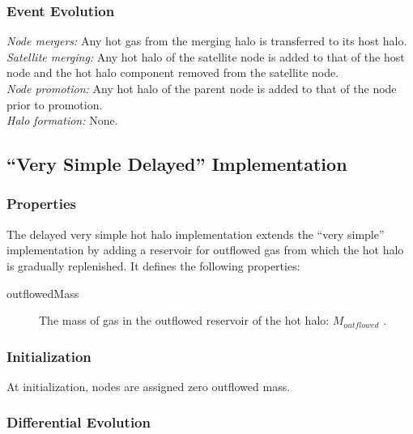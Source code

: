 \subsubsection{Event Evolution}

\noindent\emph{Node mergers:} Any hot gas from the merging halo is transferred to its host halo.\\

\noindent\emph{Satellite merging:} Any hot halo of the satellite \gls{node} is added to that of the host \gls{node} and the hot halo \gls{component} removed from the satellite node.\\

\noindent\emph{Node promotion:} Any hot halo of the parent \gls{node} is added to that of the \gls{node} prior to promotion.\\

\noindent\emph{Halo formation:} None.\\

\subsection{``Very Simple Delayed'' Implementation}

\subsubsection{Properties}

The delayed very simple hot halo implementation extends the ``very simple'' implementation by adding a reservoir for outflowed gas from which the hot halo is gradually replenished. It defines the following properties:
\begin{description}
 \item [{\normalfont \ttfamily outflowedMass}] The mass of gas in the outflowed reservoir of the hot halo: $M_{\mathrm outflowed}$ {\normalfont \ttfamily [hotHaloOutflowedMass]}.
\end{description}

\subsubsection{Initialization}

At initialization, nodes are assigned zero outflowed mass.

\subsubsection{Differential Evolution}

